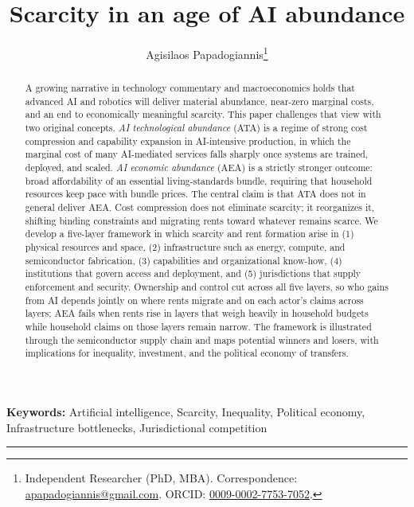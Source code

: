 \documentclass[11pt]{article}
\title{Scarcity in an age of AI abundance}
\author{Agisilaos Papadogiannis\thanks{Independent Researcher (PhD, MBA). Correspondence: \href{mailto:apapadogiannis@gmail.com}{apapadogiannis@gmail.com}. ORCID: \href{https://orcid.org/0009-0002-7753-7052}{0009-0002-7753-7052}.}}
\date{}
\begin{document}
\singlespacing
\hypersetup{urlcolor=black}
\maketitle

\begin{abstract}
A growing narrative in technology commentary and macroeconomics holds that advanced AI and robotics will deliver material abundance, near-zero marginal costs, and an end to economically meaningful scarcity. This paper challenges that view with two original concepts. \emph{AI technological abundance} (ATA) is a regime of strong cost compression and capability expansion in AI-intensive production, in which the marginal cost of many AI-mediated services falls sharply once systems are trained, deployed, and scaled. \emph{AI economic abundance} (AEA) is a strictly stronger outcome: broad affordability of an essential living-standards bundle, requiring that household resources keep pace with bundle prices. The central claim is that ATA does not in general deliver AEA. Cost compression does not eliminate scarcity; it reorganizes it, shifting binding constraints and migrating rents toward whatever remains scarce. We develop a five-layer framework in which scarcity and rent formation arise in (1) physical resources and space, (2) infrastructure such as energy, compute, and semiconductor fabrication, (3) capabilities and organizational know-how, (4) institutions that govern access and deployment, and (5) jurisdictions that supply enforcement and security. Ownership and control cut across all five layers, so who gains from AI depends jointly on where rents migrate and on each actor's claims across layers; AEA fails when rents rise in layers that weigh heavily in household budgets while household claims on those layers remain narrow. The framework is illustrated through the semiconductor supply chain and maps potential winners and losers, with implications for inequality, investment, and the political economy of transfers.
\end{abstract}

\noindent\textbf{Keywords:} Artificial intelligence, Scarcity, Inequality, Political economy, Infrastructure bottlenecks, Jurisdictional competition

\vspace{0.8em}
\noindent\rule{\textwidth}{0.4pt}
\end{document}
